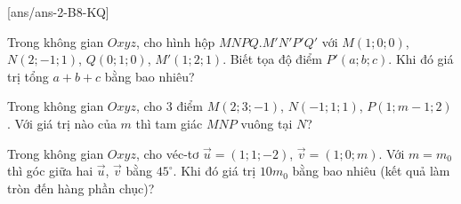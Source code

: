 [ans/ans-2-B8-KQ]
\caukq

\begin{ex}%
	Trong không gian $Oxyz$, cho hình hộp $MNPQ.M'N'P'Q'$ với $M(1;0;0)$, $N(2;-1;1)$, $Q(0;1;0)$, $M'(1;2;1)$. Biết tọa độ điểm $P'(a;b;c)$. Khi đó giá trị tổng $a+b+c$ bằng bao nhiêu?
\end{ex}

\begin{ex}%
	Trong không gian $Oxyz$, cho 3 điểm $M\left( 2;3;-1 \right)$, $N\left( -1;1;1 \right)$, $P\left( 1;m-1;2 \right)$. Với giá trị nào của $m$ thì tam giác $MNP$ vuông tại $N$?
\end{ex}

\begin{ex}%
	Trong không gian $Oxyz$, cho véc-tơ $\vec{u}=(1;1;-2)$, $\vec{v}=(1;0;m)$. Với $m=m_0$ thì góc giữa hai $\vec{u}$, $\vec{v}$ bằng $45^{\circ}$. Khi đó giá trị $10m_0$ bằng bao nhiêu (kết quả làm tròn đến hàng phần chục)?
\end{ex}

